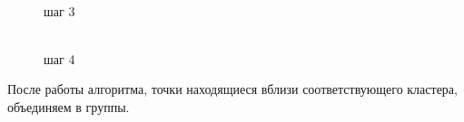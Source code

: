 \begin {itemize}
\begin{figure}[h]
\begin{minipage}[h]{0.47\linewidth}
\end{minipage}
\vfill
\begin{minipage}[h]{0.47\linewidth}
 \\ шаг 3
\end{minipage}
\hfill
\begin{minipage}[h]{0.47\linewidth}
 \\ шаг 4
\end{minipage}
\end{figure} 

После работы алгоритма, точки находящиеся вблизи соответствующего кластера, объединяем в группы.
\end{itemize}

